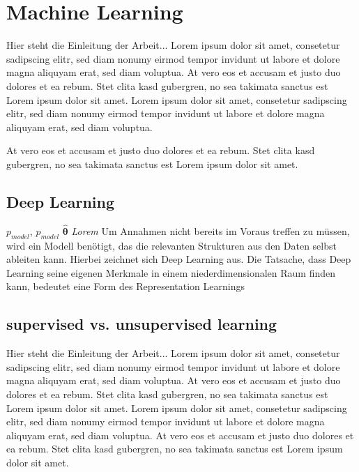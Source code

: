 \section{Machine Learning}\label{Machine Learning}
Hier steht die Einleitung der Arbeit... Lorem ipsum dolor sit amet, consetetur sadipscing elitr, sed diam nonumy eirmod tempor invidunt ut labore et dolore magna aliquyam erat, sed diam voluptua. At vero eos et accusam et justo duo dolores et ea rebum. Stet clita kasd gubergren, no sea takimata sanctus est Lorem ipsum dolor sit amet.\cite{mm2009}
Lorem ipsum dolor sit amet, consetetur sadipscing elitr, sed diam nonumy eirmod tempor invidunt ut labore et dolore magna aliquyam erat, sed diam voluptua.

At vero eos et accusam et justo duo dolores et ea rebum. Stet clita kasd gubergren, no sea takimata sanctus est Lorem ipsum dolor sit amet.
\cite{mm2009}

\subsection{Deep Learning}\label{Deep Learning}
$p_{model}$, $p_{model}$ $\boldsymbol{\hat{\theta}}$
\textsl{Lorem} 
Um Annahmen nicht bereits im Voraus treffen zu müssen, wird ein Modell benötigt, das die relevanten Strukturen aus den Daten selbst ableiten kann. Hierbei zeichnet sich Deep Learning aus. Die Tatsache, dass Deep Learning seine eigenen Merkmale in einem niederdimensionalen Raum finden kann, bedeutet eine Form des Representation Learnings

\subsection{supervised vs. unsupervised learning}\label{supervised vs. unsupervised learning}
Hier steht die Einleitung der Arbeit... Lorem ipsum dolor sit amet, consetetur sadipscing elitr, sed diam nonumy eirmod tempor invidunt ut labore et dolore magna aliquyam erat, sed diam voluptua. At vero eos et accusam et justo duo dolores et ea rebum. Stet clita kasd gubergren, no sea takimata sanctus est Lorem ipsum dolor sit amet. Lorem ipsum dolor sit amet, consetetur sadipscing elitr, sed diam nonumy eirmod tempor invidunt ut labore et dolore magna aliquyam erat, sed diam voluptua. At vero eos et accusam et justo duo dolores et ea rebum. Stet clita kasd gubergren, no sea takimata sanctus est Lorem ipsum dolor sit amet.

